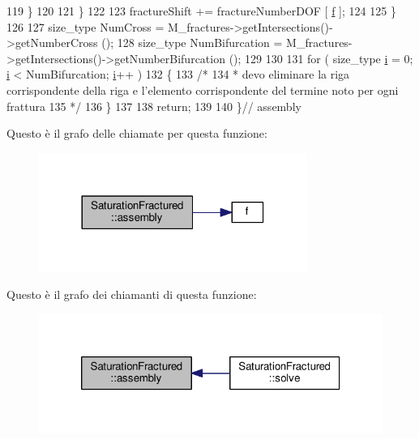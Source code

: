 \begin{DoxyCode}
119             \}
120 
121         \}
122 
123         fractureShift += fractureNumberDOF [ \hyperlink{god__e_8m_a68f477f9b30a6300d5af9b02eac82f35}{f} ];
124 
125     \}
126 
127     size\_type NumCross = M\_fractures->getIntersections()->getNumberCross ();
128     size\_type NumBifurcation = M\_fractures->getIntersections()->getNumberBifurcation ();
129 
130 
131     \textcolor{keywordflow}{for} ( size\_type \hyperlink{god__e_8m_a8604be5925f4266ab5ccc69675329c80}{i} = 0; \hyperlink{god__e_8m_a8604be5925f4266ab5ccc69675329c80}{i} < NumBifurcation; \hyperlink{god__e_8m_a8604be5925f4266ab5ccc69675329c80}{i}++ )
132     \{
133         \textcolor{comment}{/*}
134 \textcolor{comment}{         * devo eliminare la riga corrispondente della riga e l'elemento corrispondente del termine noto
       per ogni frattura}
135 \textcolor{comment}{         */}
136     \}
137 
138     \textcolor{keywordflow}{return};
139 
140 \}\textcolor{comment}{// assembly}
\end{DoxyCode}


Questo è il grafo delle chiamate per questa funzione\-:
\nopagebreak
\begin{figure}[H]
\begin{center}
\leavevmode
\includegraphics[width=248pt]{classSaturationFractured_ad5271c4036ec9a4a7c58cddbb42515ec_cgraph}
\end{center}
\end{figure}




Questo è il grafo dei chiamanti di questa funzione\-:
\nopagebreak
\begin{figure}[H]
\begin{center}
\leavevmode
\includegraphics[width=320pt]{classSaturationFractured_ad5271c4036ec9a4a7c58cddbb42515ec_icgraph}
\end{center}
\end{figure}


